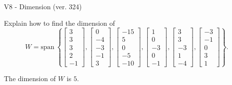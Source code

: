 \begin{exercise}
  \begin{exerciseTitle}V8 - Dimension (ver. 324)\end{exerciseTitle}
  \begin{exerciseStatement}
    Explain how to find the dimension of 
\[W=\mathrm{span}\ \left\{\left[\begin{array}{r}
3 \\
3 \\
3 \\
2 \\
-1
\end{array}\right] , \left[\begin{array}{r}
0 \\
-4 \\
-3 \\
-1 \\
3
\end{array}\right] , \left[\begin{array}{r}
-15 \\
5 \\
0 \\
-5 \\
-10
\end{array}\right] , \left[\begin{array}{r}
1 \\
0 \\
-3 \\
0 \\
-1
\end{array}\right] , \left[\begin{array}{r}
3 \\
3 \\
-3 \\
1 \\
-4
\end{array}\right] , \left[\begin{array}{r}
-3 \\
-1 \\
0 \\
3 \\
1
\end{array}\right]\right\}.\]



  \end{exerciseStatement}
  \begin{exerciseAnswer}
   The dimension of \(W\) is  \(5\).
  


  \end{exerciseAnswer}
\end{exercise}